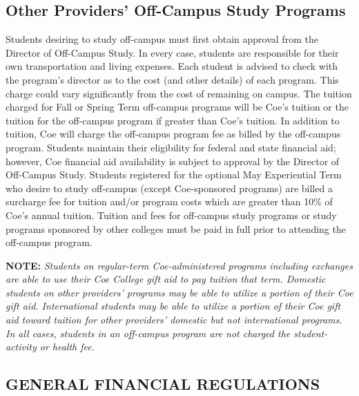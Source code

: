 \documentclass[
  letterpaper,
]{scrbook}
\begin{document}
\subsection{Other Providers' Off-Campus Study
Programs}\label{other-providers-off-campus-study-programs}

Students desiring to study off-campus must first obtain approval from
the Director of Off-Campus Study. In every case, students are
responsible for their own transportation and living expenses. Each
student is advised to check with the program's director as to the cost
(and other details) of each program. This charge could vary
significantly from the cost of remaining on campus. The tuition charged
for Fall or Spring Term off-campus programs will be Coe's tuition or the
tuition for the off-campus program if greater than Coe's tuition. In
addition to tuition, Coe will charge the off-campus program fee as
billed by the off-campus program. Students maintain their eligibility
for federal and state financial aid; however, Coe financial aid
availability is subject to approval by the Director of Off-Campus Study.
Students registered for the optional May Experiential Term who desire to
study off-campus (except Coe-sponsored programs) are billed a surcharge
fee for tuition and/or program costs which are greater than 10\% of
Coe's annual tuition. Tuition and fees for off-campus study programs or
study programs sponsored by other colleges must be paid in full prior to
attending the off-campus program.

\textbf{NOTE:} \emph{Students on regular-term Coe-administered programs
including exchanges are able to use their Coe College gift aid to pay
tuition that term. Domestic students on other providers' programs may be
able to utilize a portion of their Coe gift aid. International students
may be able to utilize a portion of their Coe gift aid toward tuition
for other providers' domestic but not international programs. In all
cases, students in an off-campus program are not charged the
student-activity or health fee.}

\subsection{GENERAL FINANCIAL
REGULATIONS}\label{general-financial-regulations}
\end{document}
